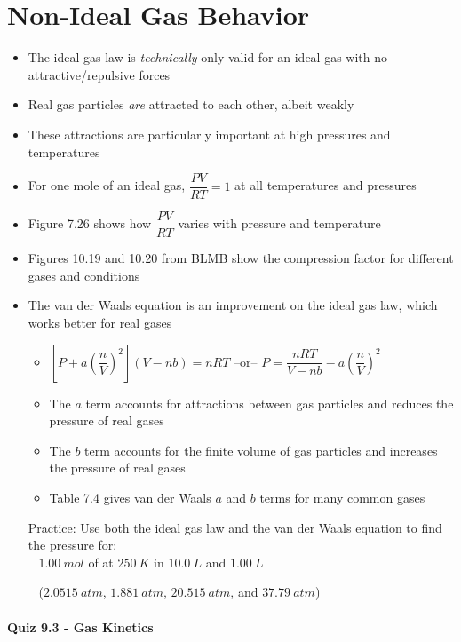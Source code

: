 \documentclass[12pt, openany, letterpaper]{memoir}
\begin{document}
\section{Non-Ideal Gas Behavior}
\begin{itemize}
  \item The ideal gas law is \emph{technically} only valid for an ideal gas with no attractive/repulsive forces
  \item Real gas particles \emph{are} attracted to each other, albeit weakly
  \item These attractions are particularly important at high pressures and temperatures
  \item For one mole of an ideal gas, $\dfrac{PV}{RT}=1$ at all temperatures and pressures
  \item Figure 7.26 shows how $\dfrac{PV}{RT}$ varies with pressure and temperature
  \item Figures 10.19 and 10.20 from BLMB show the compression factor for different gases and conditions
  \item The van der Waals equation is an improvement on the ideal gas law, which works better for real gases
    \begin{itemize}
      \item $\left[P+a\left(\dfrac{n}{V}\right)^2\right]\left(V-nb\right)=nRT$ \hspace{1em} --or-- \hspace{1em} $P=\dfrac{nRT}{V-nb}-a\left(\dfrac{n}{V}\right)^2$
      \item The $a$ term accounts for attractions between gas particles and reduces the pressure of real gases
      \item The $b$ term accounts for the finite volume of gas particles and increases the pressure of real gases
      \item Table 7.4 gives van der Waals $a$ and $b$ terms for many common gases
    \end{itemize}
    Practice: Use both the ideal gas law and the van der Waals equation to find the pressure for:\\
    ~\hphantom{Practice: } $1.00~mol$ of  at $250~K$ in $10.0~L$ and $1.00~L$

    ~\hphantom{Practice: } ($2.0515~atm$, $1.881~atm$, $20.515~atm$, and $37.79~atm$)
\end{itemize}

\paragraph*{Quiz 9.3 - Gas Kinetics}
\end{document}
